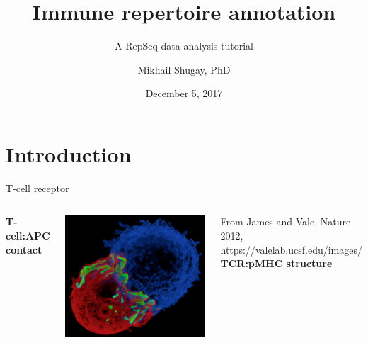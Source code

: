 \documentclass[12pt]{beamer}
\author{Mikhail Shugay, PhD}
\title{Immune repertoire annotation}
\subtitle{A RepSeq data analysis tutorial}
\institute[Skoltech]{\texttt {Skoltech, MA03172 course [Term 2, 2017-2018]}}
\date{December 5, 2017}
\begin{document}
\maketitle

\section{Introduction}
\begin{frame}{T-cell receptor}
\begin{columns}
\textbf{T-cell:APC contact}\\~\

\includegraphics[scale=0.13]{p1}\\~\

From James and Vale, Nature 2012, https://valelab.ucsf.edu/images/
\pause
{}
\textbf{TCR:pMHC structure}\\~\


\end{columns}
\end{frame}
\end{document}
